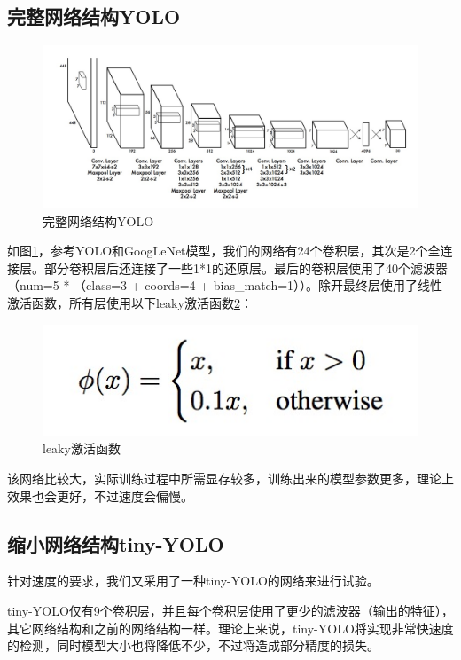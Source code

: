 {\subsection{完整网络结构YOLO}{
	\begin{figure}[htbp]
	\centering
	\includegraphics[width=5in]{images/net.png}
	\caption{完整网络结构YOLO}
	\label{net}
	\end{figure}
	如图\ref{net}，参考YOLO和GoogLeNet模型\cite{googleNet}，我们的网络有24个卷积层，其次是2个全连接层。部分卷积层后还连接了一些1*1的还原层。最后的卷积层使用了40个滤波器（num=5 * （class=3 + coords=4 + bias\_match=1））。除开最终层使用了线性激活函数，所有层使用以下leaky激活函数\ref{leaky}：
	\begin{figure}[htbp]
	\centering
	\includegraphics[width=5in]{images/leaky.png}
	\caption{leaky激活函数}
	\label{leaky}
	\end{figure}

	该网络比较大，实际训练过程中所需显存较多，训练出来的模型参数更多，理论上效果也会更好，不过速度会偏慢。
}

\subsection{缩小网络结构tiny-YOLO}{
	针对速度的要求，我们又采用了一种tiny-YOLO的网络来进行试验。

	tiny-YOLO仅有9个卷积层，并且每个卷积层使用了更少的滤波器（输出的特征），其它网络结构和之前的网络结构一样。理论上来说，tiny-YOLO将实现非常快速度的检测，同时模型大小也将降低不少，不过将造成部分精度的损失。
}
}

